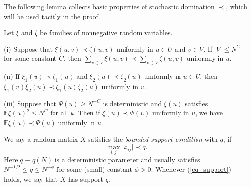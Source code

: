The following lemma collects basic properties of stochastic domination $\prec$, which will be used tacitly in the proof.

\begin{lemma}\label{lem_stodomin}
Let $\xi$ and $\zeta$ be families of nonnegative random variables.

(i) Suppose that $\xi (u,v)\prec \zeta(u,v)$ uniformly in $u\in U$ and $v\in V$. If $|V|\le N^C$ for some constant $C$, then $\sum_{v\in V} \xi(u,v) \prec \sum_{v\in V} \zeta(u,v)$ uniformly in $u$.

(ii) If $\xi_1 (u)\prec \zeta_1(u)$ and $\xi_2 (u)\prec \zeta_2(u)$ uniformly in $u\in U$, then $\xi_1(u)\xi_2(u) \prec \zeta_1(u)\zeta_2(u)$ uniformly in $u$.

(iii) Suppose that $\Psi(u)\ge N^{-C}$ is deterministic and $\xi(u)$ satisfies $\mathbb E\xi(u)^2 \le N^C$ for all $u$. Then if $\xi(u)\prec \Psi(u)$ uniformly in $u$, we have $\mathbb E\xi(u) \prec \Psi(u)$ uniformly in $u$.
\end{lemma}


\begin{definition} \label{defn_support}
We say a random matrix $X$ satisfies the {\it{bounded support condition}} with $q$, if
\begin{equation}
\max_{i,j}\vert x_{ij}\vert \prec q. \label{eq_support}
\end{equation}
Here $q\equiv q(N)$ is a deterministic parameter and usually satisfies $ N^{-{1}/{2}} \leq q \leq N^{- \phi} $ for some (small) constant $\phi>0$. Whenever (\ref{eq_support}) holds, we say that $X$ has support $q$. 
\end{definition}


